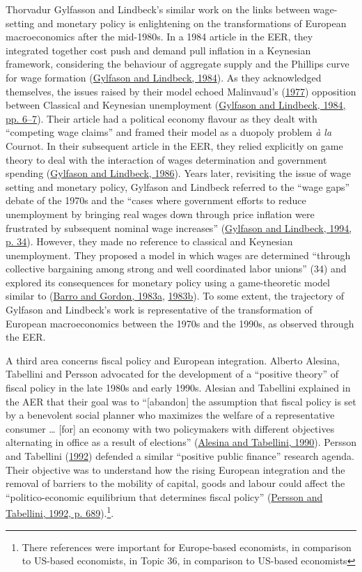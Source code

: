 \documentclass[
  12pt,
  onecolumn]{article}
\begin{document}
Thorvadur Gylfasson and Lindbeck's similar work on the links between wage-setting and monetary policy is enlightening on the transformations of European macroeconomics after the mid-1980s. In a 1984 article in the EER, they integrated together cost push and demand pull inflation in a Keynesian framework, considering the behaviour of aggregate supply and the Phillips curve for wage formation (\protect\hyperlink{ref-gylfason1984}{Gylfason and Lindbeck, 1984}). As they acknowledged themselves, the issues raised by their model echoed Malinvaud's (\protect\hyperlink{ref-malinvaud1977}{1977}) opposition between Classical and Keynesian unemployment (\protect\hyperlink{ref-gylfason1984}{Gylfason and Lindbeck, 1984, pp. 6--7}). Their article had a political economy flavour as they dealt with ``competing wage claims'' and framed their model as a duopoly problem \emph{à la} Cournot. In their subsequent article in the EER, they relied explicitly on game theory to deal with the interaction of wages determination and government spending (\protect\hyperlink{ref-gylfason1986}{Gylfason and Lindbeck, 1986}). Years later, revisiting the issue of wage setting and monetary policy, Gylfason and Lindbeck referred to the ``wage gaps'' debate of the 1970s and the ``cases where government efforts to reduce unemployment by bringing real wages down through price inflation were frustrated by subsequent nominal wage increases'' (\protect\hyperlink{ref-gylfason1994}{Gylfason and Lindbeck, 1994, p. 34}). However, they made no reference to classical and Keynesian unemployment. They proposed a model in which wages are determined ``through collective bargaining among strong and well coordinated labor unions'' (34) and explored its consequences for monetary policy using a game-theoretic model similar to (\protect\hyperlink{ref-barro1983}{Barro and Gordon, 1983a}, \protect\hyperlink{ref-barro1983c}{1983b}). To some extent, the trajectory of Gylfason and Lindbeck's work is representative of the transformation of European macroeconomics between the 1970s and the 1990s, as observed through the EER.

A third area concerns fiscal policy and European integration. Alberto Alesina, Tabellini and Persson advocated for the development of a ``positive theory'' of fiscal policy in the late 1980s and early 1990s. Alesian and Tabellini explained in the AER that their goal was to ``{[}abandon{]} the assumption that fiscal policy is set by a benevolent social planner who maximizes the welfare of a representative consumer \ldots{} {[}for{]} an economy with two policymakers with different objectives alternating in office as a result of elections'' (\protect\hyperlink{ref-alesina1990}{Alesina and Tabellini, 1990}). Persson and Tabellini (\protect\hyperlink{ref-persson1992}{1992}) defended a similar ``positive public finance'' research agenda. Their objective was to understand how the rising European integration and the removal of barriers to the mobility of capital, goods and labour could affect the ``politico-economic equilibrium that determines fiscal policy'' (\protect\hyperlink{ref-persson1992}{Persson and Tabellini, 1992, p. 689}).\footnote{There references were important for Europe-based economists, in comparison to US-based economists, in Topic 36, in comparison to US-based economists}.
\end{document}
